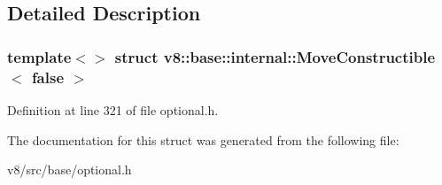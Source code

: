 \subsection{Detailed Description}
\subsubsection*{template$<$$>$\newline
struct v8\+::base\+::internal\+::\+Move\+Constructible$<$ false $>$}



Definition at line 321 of file optional.\+h.



The documentation for this struct was generated from the following file\+:\begin{DoxyCompactItemize}
\item 
v8/src/base/optional.\+h\end{DoxyCompactItemize}
